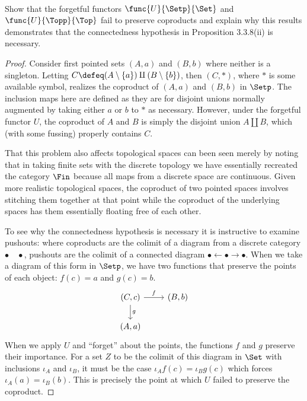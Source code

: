 \documentclass[main.tex]{subfiles}
\begin{document}
\paragraph{}
\begin{exercise}
	Show that the forgetful functors \(\func{U}{\Setp}{\Set}\) and
	\(\func{U}{\Topp}{\Top}\) fail to preserve coproducts and explain why this
	results demonstrates that the connectedness hypothesis in Proposition
	3.3.8(ii) is necessary.
\end{exercise}

\begin{proof}
	Consider first pointed sets \((A,a)\) and \((B,b)\) where neither is a
	singleton. Letting \(C\defeq (A\setminus\{a\})\amalg(B\setminus\{b\})\),
	then \((C,*)\), where \(*\) is some available symbol, realizes the coproduct
	of \((A,a)\) and \((B,b)\) in \(\Setp\). The inclusion maps here are defined
	as they are for disjoint unions normally augmented by taking either \(a\) or
	\(b\) to \(*\) as necessary. However, under the forgetful functor \(U\), the
	coproduct of \(A\) and \(B\) is simply the disjoint union \(A\amalg B\),
	which (with some fussing) properly contains \(C\).

	That this problem also affects topological spaces can been seen merely by
	noting that in taking finite sets with the discrete topology we have
	essentially recreated the category \(\Fin\) because all maps from a discrete
	space are continuous. Given more realistic topological spaces, the coproduct
	of two pointed spaces involves stitching them together at that point while
	the coproduct of the underlying spaces has them essentially floating free of
	each other.

	To see why the connectedness hypothesis is necessary it is instructive to
	examine pushouts: where coproducts are the colimit of a diagram from a
	discrete category \(\bullet\quad\bullet\), pushouts are the colimit of a
	connected diagram \(\bullet\gets\bullet\to\bullet\). When we take a diagram
	of this form in \(\Setp\), we have two functions that preserve the points of
	each object: \(f(c)=a\) and \(g(c)=b\).
	\begin{equation*}\begin{tikzcd}
			(C,c) \ar[r, "f"] \ar[d, "g"] & (B,b) \\
			(A,a)
	\end{tikzcd}\end{equation*}
	When we apply \(U\) and ``forget'' about the points, the functions \(f\) and
	\(g\) preserve their importance. For a set \(Z\) to be the colimit of this
	diagram in \(\Set\) with inclusions \(\iota_A\) and \(\iota_B\), it must be
	the case \(\iota_Af(c)=\iota_Bg(c)\) which forces \(\iota_A(a)=\iota_B(b)\).
	This is precisely the point at which \(U\) failed to preserve the coproduct.

\end{proof}
\end{document}
